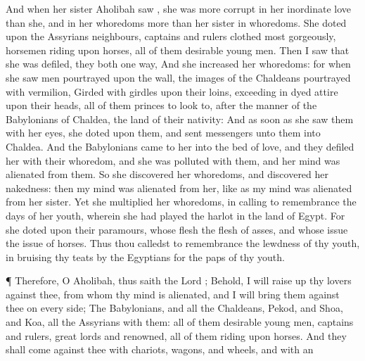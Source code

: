 {\par }{\PP {}And when her
sister
Aholibah
saw
{}, she was more
corrupt in her inordinate
love than she, and in her
whoredoms more than her
sister in
{}
whoredoms.
She
doted upon the
Assyrians
{}
neighbours,
captains and
rulers
clothed most
gorgeously,
horsemen
riding upon
horses, all of them
desirable young
men.
Then I
saw that she was
defiled,
{} they
{}
both
one
way,
And
{} she
increased her
whoredoms: for when she
saw
men
pourtrayed upon the
wall, the
images of the
Chaldeans
pourtrayed with
vermilion,
Girded with
girdles upon their
loins,
exceeding in dyed
attire upon their
heads, all of them
princes to look
to, after the
manner of the
Babylonians of
Chaldea, the
land of their
nativity:
And as soon as she
saw them with her
eyes, she
doted upon them, and
sent
messengers unto them into
Chaldea.
And the
Babylonians
came to her into the
bed of
love, and they
defiled her with their
whoredom, and she was
polluted with them, and her
mind was
alienated from them.
So she
discovered her
whoredoms, and
discovered her
nakedness: then my
mind was
alienated from her, like as my
mind was
alienated from her
sister.
Yet she
multiplied her
whoredoms, in calling to
remembrance the
days of her
youth, wherein she had played the
harlot in the
land of
Egypt.
For she
doted upon their
paramours, whose
flesh
{} the
flesh of
asses, and whose
issue
{} the
issue of
horses.
Thus thou calledst to
remembrance the
lewdness of thy
youth, in
bruising thy
teats by the
Egyptians for the
paps of thy
youth.
\par }{\PP {}¶ Therefore, O
Aholibah, thus
saith the
Lord
{}; Behold, I will raise
up thy
lovers against thee, from whom thy
mind is
alienated, and I will
bring them against thee on every
side;
The
Babylonians, and all the
Chaldeans,
Pekod, and
Shoa, and
Koa,
{} all the
Assyrians with them: all of them
desirable young
men,
captains and
rulers, great
lords and
renowned, all of them
riding upon
horses.
And they shall
come against thee with
chariots,
wagons, and
wheels, and with an
}
